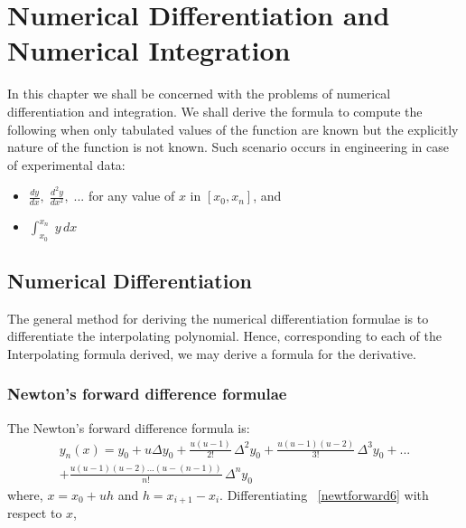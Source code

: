 \documentclass[aima203_lecturenotes_ku.tex]{subfiles}
\begin{document}
\chapter{Numerical Differentiation and Numerical Integration}

In this chapter we shall be concerned with the problems of numerical differentiation and integration. We shall derive the formula to compute the following when only tabulated values of the function are known but the explicitly nature of the function is not known. Such scenario occurs in engineering in case of experimental data:

\begin{itemize}
\item $\displaystyle \frac{dy}{dx}, \; \frac{d^2y}{dx^2},\;...$ for any value of $x$ in $[x_0, x_n]$, and

\item $\displaystyle \int_{x_0}^{x_n} \; y\,dx$
\end{itemize}

\section{Numerical Differentiation}
The general method for deriving the numerical differentiation formulae is to differentiate the interpolating polynomial. Hence, corresponding to each of the Interpolating formula derived, we may derive a formula for the derivative.

\subsection{Newton's forward difference formulae}
The Newton's forward difference formula is:
\begin{equation}
  \label{newtforward6}
 \begin{gathered}
  y_n(x) = y_0 + u \Delta y_0 + \frac{u(u-1)}{2!}\, \Delta ^2 y_0 + \frac{u(u-1)(u-2)}{3!}\, \Delta ^3 y_0 + ... \\[1mm]
  + \frac{u(u-1)(u-2)...(u-(n-1))}{n!}\, \Delta ^n y_0
\end{gathered}
\end{equation}
where, $x=x_0 + uh$ and $h = x_{i+1} - x_{i}$. Differentiating ~\ref{newtforward6} with respect to $x$,
\end{document}
